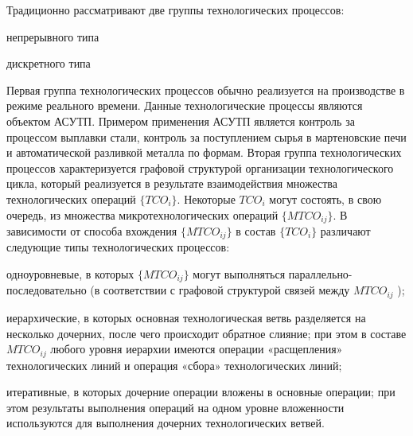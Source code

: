 \begin{SCn}
\end{SCn}


\begin{SCn}
\end{SCn}



Традиционно рассматривают две группы технологических процессов:
\begin{textitemize}
	\item непрерывного типа
	\item дискретного типа
\end{textitemize}

Первая группа технологических процессов обычно реализуется на производстве в режиме реального времени. Данные технологические процессы являются объектом АСУТП. Примером применения АСУТП является контроль за процессом выплавки стали, контроль за поступлением сырья в мартеновские печи и автоматической разливкой металла по формам. Вторая группа технологических процессов характеризуется графовой структурой организации технологического цикла, который реализуется в результате взаимодействия множества технологических операций $\big\{TCO_i\big\}$. Некоторые $TCO_i$ могут состоять, в свою очередь, из множества микротехнологических операций $\big\{MTCO_{ij}\big\}$.
В зависимости от способа вхождения $\big\{MTCO_{ij}\big\}$  в состав $\big\{TCO_i\big\}$ различают следующие типы технологических процессов:

\begin{textitemize}
	\item одноуровневые, в которых $\big\{MTCO_{ij}\big\}$ могут выполняться параллельно-последовательно (в соответствии с графовой структурой связей между $MTCO_{ij}$ );
	\item иерархические, в которых основная технологическая ветвь разделяется на несколько дочерних, после чего происходит обратное слияние; при этом в составе $MTCO_{ij}$ любого уровня иерархии имеются операции «расщепления» технологических линий и операция «сбора» технологических линий;
    \item итеративные, в которых дочерние операции вложены в основные операции; при этом результаты выполнения операций на одном уровне вложенности используются для выполнения дочерних технологических ветвей.
\end{textitemize}

